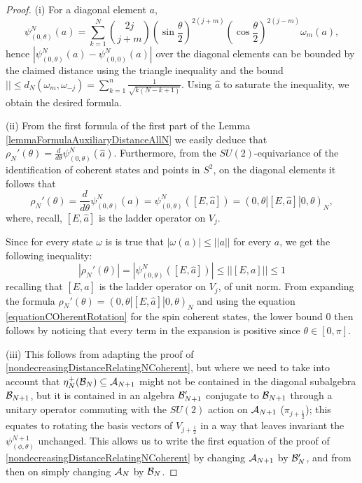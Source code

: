 \begin{proof}
(i) For a diagonal element $a$,  
\begin{equation*}
    \psi^N_{(0, \theta)}(a) = \sum_{k = 1}^N \binom{2j}{j+m} (\sin \frac{\theta}{2})^{2(j+m)} (\cos \frac{\theta}{2})^{2(j-m)} \omega_m(a),
\end{equation*}
hence $|\psi^N_{(0, \theta)}(a) - \psi^N_{(0, 0)}(a)|$ over the diagonal elements can be bounded by the claimed distance using the triangle inequality and the bound $|| \leq d_N(\omega_m, \omega_{-j}) = \sum_{k = 1}^n \frac{1}{\sqrt{k(N - k+1)}}$. Using $\hat a$ to saturate the inequality, we obtain the desired formula.

(ii) From the first formula of the first part of the Lemma \ref{lemmaFormulaAuxiliaryDistanceAllN} we easily deduce that $\rho_N'(\theta) = \frac{d}{d\theta} \psi^N_{(0, \theta)} (\hat a)$. Furthermore, from the $SU(2)$-equivariance of the identification of coherent states and points in $S^2$, on the diagonal elements it follows that 
\begin{equation}
    \rho_N'(\theta) 
        =\frac{d}{d\theta} \psi^N_{(0, \theta)} (\hat a) 
        = \psi^N_{(0, \theta)}([E, \hat a])
        = (0, \theta| [E, \hat a] |0, \theta)_N,
\end{equation} 
where, recall, $[E, \hat a]$ is the ladder operator on $V_j$.

Since for every state $\omega$ is is true that $|\omega(a)| \leq ||a||$ for every $a$, we get the following inequality:
\begin{equation*}
    |\rho_N'(\theta)| = |\psi^N_{(0, \theta)}([E, \hat a])| \leq ||[E, a]|| \leq 1
\end{equation*}
recalling that $[E, \hat a]$ is the ladder operator on $V_j$, of unit norm. From expanding the formula $\rho_N'(\theta) = (0, \theta| [E, \hat a] |0, \theta)_N$ and using the equation \eqref{equationCOherentRotation} for the spin coherent states, the lower bound $0$ then follows by noticing that every term in the expansion is positive since $\theta \in [0, \pi]$.

(iii) This follows from adapting the proof of \ref{nondecreasingDistanceRelatingNCoherent}, but where we need to take into account that $\eta^+_N(\mathcal B_N) \subseteq \mathcal A_{N+1}$ might not be contained in the diagonal subalgebra $\mathcal B_{N+1}$, but it is contained in an algebra $\mathcal B_{N+1}'$ conjugate to $\mathcal B_{N+1}$ through a unitary operator commuting with the $SU(2)$ action on $\mathcal A_{N+1}$ ($\pi_{j + \frac{1}{2}}$); this equates to rotating the basis vectors of $V_{j + \frac{1}{2}}$ in a way that leaves invariant the $\psi^{N+1}_{(\phi, \theta)}$ unchanged. This allows us to write the first equation of the proof of \ref{nondecreasingDistanceRelatingNCoherent} by changing $\mathcal A_{N+1}$ by $\mathcal B'_N$, and from then on simply changing $\mathcal A_N$ by $\mathcal B_N$.
\end{proof}


